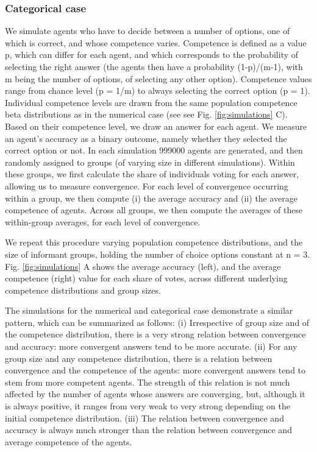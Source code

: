 \documentclass[
  doc,floatsintext]{apa6}
\begin{document}
\hypertarget{categorical-case}{%
\subsubsection{Categorical case}\label{categorical-case}}

We simulate agents who have to decide between a number of options, one of which is correct, and whose competence varies. Competence is defined as a value p, which can differ for each agent, and which corresponds to the probability of selecting the right answer (the agents then have a probability (1-p)/(m-1), with m being the number of options, of selecting any other option). Competence values range from chance level (p = 1/m) to always selecting the correct option (p = 1). Individual competence levels are drawn from the same population competence beta distributions as in the numerical case (see see Fig. \ref{fig:simulations} C). Based on their competence level, we draw an answer for each agent. We measure an agent's accuracy as a binary outcome, namely whether they selected the correct option or not. In each simulation 999000 agents are generated, and then randomly assigned to groups (of varying size in different simulations). Within these groups, we first calculate the share of individuals voting for each answer, allowing us to measure convergence. For each level of convergence occurring within a group, we then compute (i) the average accuracy and (ii) the average competence of agents. Across all groups, we then compute the averages of these within-group averages, for each level of convergence.

We repeat this procedure varying population competence distributions, and the size of informant groups, holding the number of choice options constant at n = 3. Fig. \ref{fig:simulations} A shows the average accuracy (left), and the average competence (right) value for each share of votes, across different underlying competence distributions and group sizes.

The simulations for the numerical and categorical case demonstrate a similar pattern, which can be summarized as follows: (i) Irrespective of group size and of the competence distribution, there is a very strong relation between convergence and accuracy: more convergent answers tend to be more accurate. (ii) For any group size and any competence distribution, there is a relation between convergence and the competence of the agents: more convergent answers tend to stem from more competent agents. The strength of this relation is not much affected by the number of agents whose answers are converging, but, although it is always positive, it ranges from very weak to very strong depending on the initial competence distribution. (iii) The relation between convergence and accuracy is always much stronger than the relation between convergence and average competence of the agents.
\end{document}
